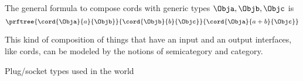 The general formula to compose cords with generic types $\Obja, \Objb, \Objc$ is 
\begin{equation}
  \label{eq:cords-generic}
  \prftree{\cord{\Obja}{a}{\Objb}}{\cord{\Objb}{b}{\Objc}}{\cord{\Obja}{a+b}{\Objc}}
\end{equation}

This kind of composition of things that have an input and an output interfaces, like cords, can be modeled by the notions of semicategory and category.




% 

%
%
%


\begin{marginfigure}
  \centering
{}











\caption{Plug/socket types used in the world}
  \label{fig:plugs}
\end{marginfigure}

 
 
